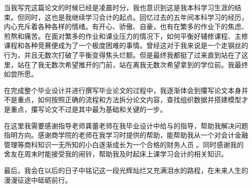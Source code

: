 

\begin{acknowledgements}
当我写完这篇论文的时候已经是凌晨时分，我也意识到这是我本科学习生涯的结束。但同时，这也是我继续学习会计的起点。回忆过去的五年间本科学习的经历，内心充斥着各种各样的情绪。有开心、骄傲、自豪，也有在繁多的作业下的焦虑、煎熬和痛苦。在面对繁多的作业和课业压力的情况下，如何平衡好辅修课程、主修课程和各种竞赛便成为了一个极度困难的事情。曾经这对于我来说是一个走钢丝的行为，并且无数次打破了平衡变得焦头烂额。但是最终我都挺了过来直到站在了这里，站在了我无数次希望推开的门前，站在离我无数次希望拿到的学位前。我最终如尝所愿。

在完成整个毕业设计并进行撰写毕业论文的过程中，我逐渐体会到攥写论文本身并不是重点，如何按照正确的流程和方法拆分论文内容，查找组织数据并搭建模型才是重点，攥写论文不过是其中最为基础和关键的一步。

在这里我需要感谢指导老师龚蕾老师在我毕业设计中给与的指导，帮助我解决问题指明方向。感谢商学院的老师在我学习时提供的帮助，能帮助我从一个对会计金融管理等商科知识一无所知的小白逐渐成长为一个合格的财务人员 。同时感谢我的舍友在周末时能接受我的闹铃，帮助我及时起床上课学习会计的相关知识。

最后，我会在以后的日子中铭记这一段光辉灿烂又充满泪水的路程，在未来人生的漫漫征途中砥砺前行。

\end{acknowledgements}
